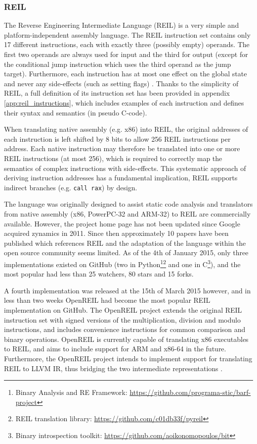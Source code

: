
\subsubsection{REIL}
\label{sec:lit_review_reil}

The Reverse Engineering Intermediate Language (REIL) is a very simple and platform-independent assembly language. The REIL instruction set contains only 17 different instructions, each with exactly three (possibly empty) operands. The first two operands are always used for input and the third for output (except for the conditional jump instruction which uses the third operand as the jump target). Furthermore, each instruction has at most one effect on the global state and never any side-effects (such as setting flags) \cite{reil_paper,reil_spec}. Thanks to the simplicity of REIL, a full definition of its instruction set has been provided in appendix \ref{app:reil_instructions}, which includes examples of each instruction and defines their syntax and semantics (in pseudo C-code).

When translating native assembly (e.g. x86) into REIL, the original addresses of each instruction is left shifted by 8 bits to allow 256 REIL instructions per address. Each native instruction may therefore be translated into one or more REIL instructions (at most 256), which is required to correctly map the semantics of complex instructions with side-effects. This systematic approach of deriving instruction addresses has a fundamental implication, REIL supports indirect branches (e.g. \texttt{call rax}) by design.

The language was originally designed to assist static code analysis and translators from native assembly (x86, PowerPC-32 and ARM-32) to REIL are commercially available. However, the project home page has not been updated since Google acquired zynamics in 2011. Since then approximately 10 papers have been published which references REIL and the adaptation of the language within the open source community seems limited. As of the 4th of January 2015, only three implementations existed on GitHub (two in Python\footnote{Binary Analysis and RE Framework: \url{https://github.com/programa-stic/barf-project}}\footnote{REIL translation library: \url{https://github.com/c01db33f/pyreil}} and one in C\footnote{Binary introspection toolkit: \url{https://github.com/aoikonomopoulos/bit}}), and the most popular had less than 25 watchers, 80 stars and 15 forks.

A fourth implementation was released at the 15th of March 2015 however, and in less than two weeks OpenREIL had become the most popular REIL implementation on GitHub. The OpenREIL project extends the original REIL instruction set with signed versions of the multiplication, division and modulo instructions, and includes convenience instructions for common comparison and binary operations. OpenREIL is currently capable of translating x86 executables to REIL, and aims to include support for ARM and x86-64 in the future. Furthermore, the OpenREIL project intends to implement support for translating REIL to LLVM IR, thus bridging the two intermediate representations \cite{openreil}.
